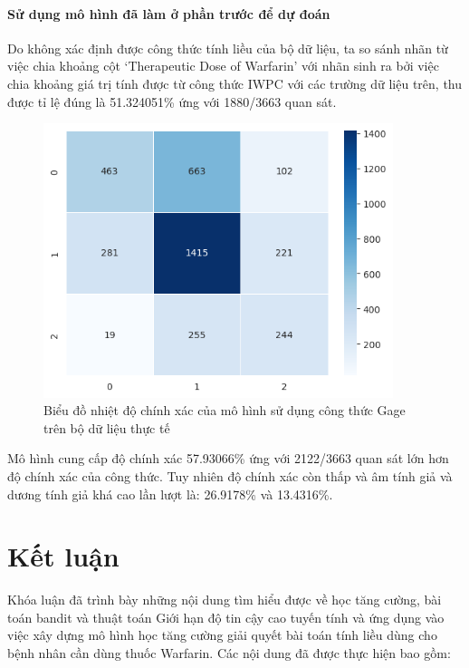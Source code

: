\documentclass[14pt,oneside]{scrbook}
\begin{document}
\subsubsection{Sử dụng mô hình đã làm ở phần trước để dự
đoán}\label{sux1eed-dux1ee5ng-muxf4-huxecnh-ux111uxe3-luxe0m-ux1edf-phux1ea7n-trux1b0ux1edbc-ux111ux1ec3-dux1ef1-ux111ouxe1n-1}

Do không xác định được công thức tính liều của bộ dữ liệu, ta so sánh
nhãn từ việc chia khoảng cột `Therapeutic Dose of Warfarin' với nhãn
sinh ra bởi việc chia khoảng giá trị tính được từ công thức IWPC với các
trường dữ liệu trên, thu được tỉ lệ đúng là 51.324051\% ứng với
1880/3663 quan sát.

\begin{figure}
\centering
\includegraphics[width=\textwidth,height=8cm]{image/gage_heatmap_real.png}
\caption{Biểu đồ nhiệt độ chính xác của mô hình sử dụng công thức Gage
trên bộ dữ liệu thực tế}
\end{figure}

Mô hình cung cấp độ chính xác 57.93066\% ứng với 2122/3663 quan sát lớn
hơn độ chính xác của công thức. Tuy nhiên độ chính xác còn thấp và âm
tính giả và dương tính giả khá cao lần lượt là: 26.9178\% và 13.4316\%.

\chapter*{Kết luận}\label{kux1ebft-luux1eadn}


Khóa luận đã trình bày những nội dung tìm hiểu được về học tăng cường,
bài toán bandit và thuật toán Giới hạn độ tin cậy cao tuyến tính và ứng
dụng vào việc xây dựng mô hình học tăng cường giải quyết bài toán tính
liều dùng cho bệnh nhân cần dùng thuốc Warfarin. Các nội dung đã được
thực hiện bao gồm:
\end{document}
